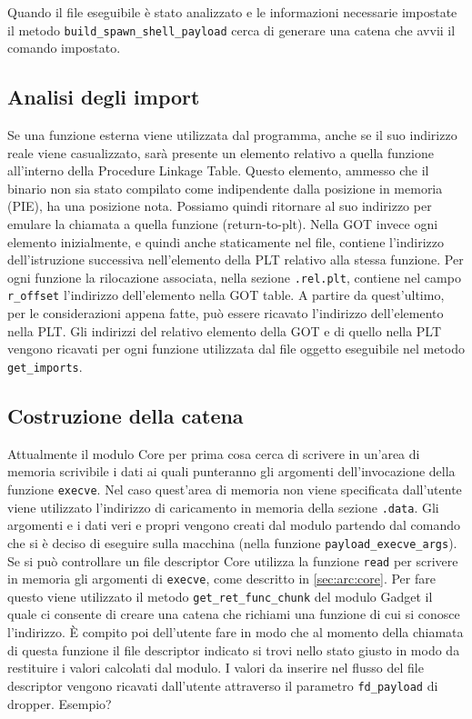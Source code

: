 Quando il file eseguibile è stato analizzato e le informazioni
necessarie impostate il metodo \lstinline{build_spawn_shell_payload}
cerca di generare una catena che avvii il comando impostato.

\subsection{Analisi degli import}

Se una funzione esterna viene utilizzata dal programma, anche se il
suo indirizzo reale viene casualizzato, sarà presente un elemento
relativo a quella funzione all'interno della Procedure Linkage
Table. Questo elemento, ammesso che il binario non sia stato compilato
come indipendente dalla posizione in memoria (PIE), ha una posizione
nota. Possiamo quindi ritornare al suo indirizzo per emulare la
chiamata a quella funzione (return-to-plt). Nella GOT invece ogni
elemento inizialmente, e quindi anche staticamente nel file, contiene
l'indirizzo dell'istruzione successiva nell'elemento della PLT
relativo alla stessa funzione. Per ogni funzione la rilocazione
associata, nella sezione \lstinline{.rel.plt}, contiene nel campo
\lstinline{r_offset} l'indirizzo dell'elemento nella GOT table. A
partire da quest'ultimo, per le considerazioni appena fatte, può
essere ricavato l'indirizzo dell'elemento nella PLT. Gli indirizzi del
relativo elemento della GOT e di quello nella PLT vengono ricavati per
ogni funzione utilizzata dal file oggetto eseguibile nel metodo
\lstinline{get_imports}.

\subsection{Costruzione della catena}

Attualmente il modulo Core per prima cosa cerca di scrivere in un'area
di memoria scrivibile i dati ai quali punteranno gli argomenti
dell'invocazione della funzione \lstinline{execve}. Nel caso
quest'area di memoria non viene specificata dall'utente viene
utilizzato l'indirizzo di caricamento in memoria della sezione
\lstinline{.data}. Gli argomenti e i dati veri e propri vengono creati
dal modulo partendo dal comando che si è deciso di eseguire sulla
macchina (nella funzione \lstinline{payload_execve_args}). Se si può
controllare un file descriptor Core utilizza la funzione
\lstinline{read} per scrivere in memoria gli argomenti di
\lstinline{execve}, come descritto in \ref{sec:arc:core}. Per fare
questo viene utilizzato il metodo \lstinline{get_ret_func_chunk} del
modulo Gadget il quale ci consente di creare una catena che
richiami una funzione di cui si conosce l'indirizzo. È compito poi
dell'utente fare in modo che al momento della chiamata di questa
funzione il file descriptor indicato si trovi nello stato giusto in
modo da restituire i valori calcolati dal modulo. I valori da inserire
nel flusso del file descriptor vengono ricavati dall'utente attraverso
il parametro \lstinline{fd_payload} di dropper.
Esempio?

